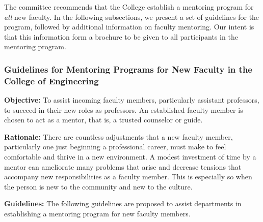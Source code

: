The committee recommends that the College establish a mentoring
program for {\sl all} new faculty.  In the following subsections, we
present a set of guidelines for the program, followed by
additional information on faculty mentoring.
Our intent is that this information form a brochure to be
given to all participants in the mentoring program.

\subsubsection{Guidelines for Mentoring Programs for New Faculty in the College of
Engineering}


\noindent
{\bf
Objective:}  To assist incoming faculty members, particularly assistant
professors, to succeed in their new roles as professors.  An established
faculty member is chosen to act as a mentor, that is, a trusted counselor
or guide.

\bigskip

\noindent
{\bf
Rationale:}  There are countless adjustments that a new faculty member,
particularly one just beginning a professional career, must make to feel
comfortable and thrive in a new environment.  A modest investment of time
by a mentor can ameliorate many problems that arise and decrease tensions
that accompany new responsibilities as a faculty member.  This is
especially so when the person is new to the community and new to the
culture.



\bigskip

\noindent
{\bf
Guidelines:}  The following guidelines are proposed to assist departments in
establishing a mentoring program for new faculty members.


